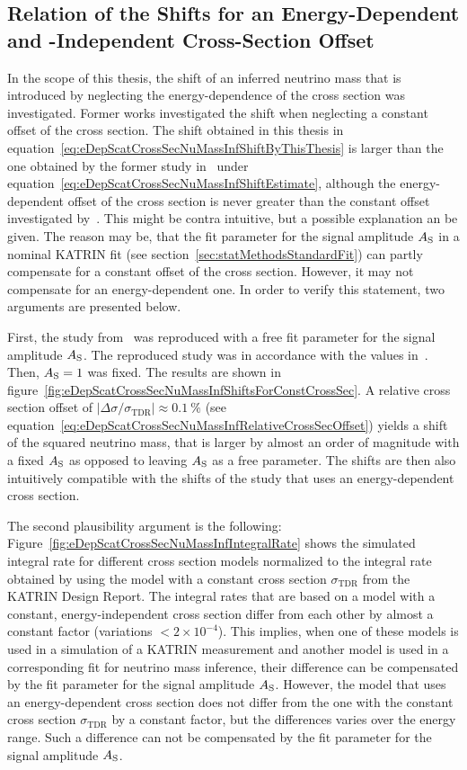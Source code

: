 \subsection{Relation of the Shifts for an Energy-Dependent and -Independent Cross-Section Offset}
\label{sec:eDepScatCrossSecNuMassInfRelateGrohAndFormerWork}
In the scope of this thesis, the shift of an inferred neutrino mass that is introduced by neglecting the energy-dependence of the cross section was investigated. Former works investigated the shift when neglecting a constant offset of the cross section. The shift obtained in this thesis in equation~\eqref{eq:eDepScatCrossSecNuMassInfShiftByThisThesis} is larger than the one obtained by the former study in~\cite{Groh2015} under equation~\eqref{eq:eDepScatCrossSecNuMassInfShiftEstimate}, although the energy-dependent offset of the cross section is never greater than the constant offset investigated by~\cite{Groh2015}. This might be contra intuitive, but a possible explanation an be given. The reason may be, that the fit parameter for the signal amplitude $A_{\mathrm{S}}$ in a nominal KATRIN fit (see section~\ref{sec:statMethodsStandardFit}) can partly compensate for a constant offset of the cross section. However, it may not compensate for an energy-dependent one. In order to verify this statement, two arguments are presented below.

First, the study from~\cite{Groh2015} was reproduced with a free fit parameter for the signal amplitude $A_{\mathrm{S}}$. The reproduced study was in accordance with the values in~\cite{Groh2015}. Then, $A_{\mathrm{S}}=1$ was fixed. The results are shown in figure~\ref{fig:eDepScatCrossSecNuMassInfShiftsForConstCrossSec}. A relative cross section offset of $
\left|
	\Delta\sigma/\sigma_\mathrm{TDR}
\right| \approx \SI{0.1}{\percent}
$ (see equation~\ref{eq:eDepScatCrossSecNuMassInfRelativeCrossSecOffset}) yields a shift of the squared neutrino mass, that is larger by almost an order of magnitude with a fixed $A_{\mathrm{S}}$ as opposed to leaving $A_{\mathrm{S}}$ as a free parameter. The shifts are then also intuitively compatible with the shifts of the study that uses an energy-dependent cross section.

The second plausibility argument is the following: Figure~\ref{fig:eDepScatCrossSecNuMassInfIntegralRate} shows the simulated integral rate for different cross section models normalized to the integral rate obtained by using the model with a constant cross section $\sigma_\mathrm{TDR}$ from the KATRIN Design Report. The integral rates that are based on a model with a constant, energy-independent cross section differ from each other by almost a constant factor (variations $<2\times10^{-4}$). This implies, when one of these models is used in a simulation of a KATRIN measurement and another model is used in a corresponding fit for neutrino mass inference, their difference can be compensated by the fit parameter for the signal amplitude $A_{\mathrm{S}}$. However, the model that uses an energy-dependent cross section does not differ from the one with the constant cross section $\sigma_\mathrm{TDR}$ by a constant factor, but the differences varies over the energy range. Such a difference can not be compensated by the fit parameter for the signal amplitude $A_{\mathrm{S}}$.

